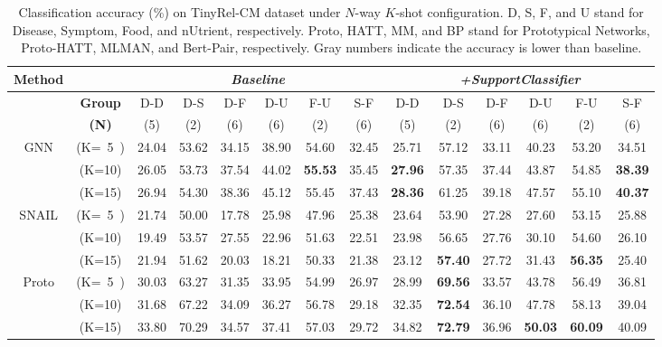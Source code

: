 \begin{table*}[th]
\centering
\small
\caption{Classification accuracy (\%) on TinyRel-CM dataset under
	$N$-way $K$-shot configuration.
	D, S, F, and U stand for Disease, Symptom, Food, and nUtrient, respectively.
	Proto, HATT, MM, and BP stand for Prototypical Networks, Proto-HATT, MLMAN, and Bert-Pair, respectively.
	Gray numbers indicate the accuracy is lower than baseline.}
\label{FRMresult}
\begin{tabular}{|c|c|cccccc|cccccc|}
\hline
\textbf{Method} & &\multicolumn{6}{c|}{\emph{Baseline}} &\multicolumn{6}{c|}{\emph{+SupportClassifier}} \\ \hline
&\textbf{Group} & D-D & D-S & D-F & D-U & F-U & S-F& D-D & D-S & D-F & D-U & F-U & S-F\\
&\textbf{(N)} & (5) & (2) & (6) & (6)& (2) & (6)& (5) & (2) & (6) & (6)& (2) & (6)\\ \hline
\multirow{3}{*}{GNN}   & (K=~5~)   & 24.04&53.62 &34.15 &38.90 & 54.60& 32.45 &25.71&57.12&33.11&40.23&\textcolor[rgb]{0.45,0.45,0.45}{53.20}&34.51 \\
 & (K=10) & 26.05& 53.73&37.54 &44.02 &\textbf{55.53} &35.45 &\textbf{27.96}&57.35&37.44&43.87&\textcolor[rgb]{0.45,0.45,0.45}{54.85}&\textbf{38.39} \\
 & (K=15) & 26.94& 54.30&38.36 &45.12 &55.45 &37.43 &\textbf{28.36}&61.25&39.18&47.57&\textcolor[rgb]{0.45,0.45,0.45}{55.10}&\textbf{40.37}\\ \hline
\multirow{3}{*}{SNAIL}
 & (K=~5~) &21.74 & 50.00 &17.78 &25.98 & 47.96& 25.38     &23.64&53.90&27.28&27.60&53.15&25.88\\
  & (K=10) & 19.49 & 53.57&27.55 &22.96 &51.63 &22.51      &23.98&56.65&27.76&30.10&54.60&26.10 \\
 & (K=15) & 21.94& 51.62&20.03 &18.21 &50.33 &21.38         &23.12&\textbf{57.40}&27.72&31.43&\textbf{56.35}&25.40\\ \hline
\multirow{3}{*}{Proto}      & (K=~5~)  & 30.03&63.27 &31.35 &33.95 & 54.99& 26.97 &28.99 &\textbf{69.56} &33.57 & 43.78&56.49 &36.81\\
 & (K=10) & 31.68& 67.22&34.09 &36.27 &56.78 &29.18 &32.35 &\textbf{72.54} &36.10 & 47.78& 58.13&39.04\\
 & (K=15) & 33.80& 70.29&34.57 &37.41 &57.03 &29.72 &34.82 &\textbf{72.79} &36.96 &\textbf{50.03} &\textbf{ 60.09} &40.09\\ \hline


\end{tabular}
\end{table*}
